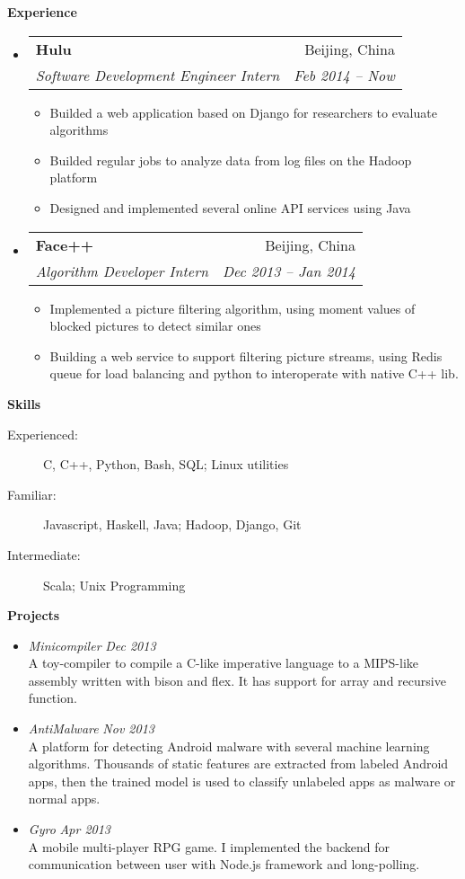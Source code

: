 \documentclass[letterpaper,11pt]{article}
\makeatletter
\newcommand{\resitem}[1]{\item #1 \vspace{-2pt}}
\newcommand{\resheading}[1]{{\large \colorbox{mygrey}{\begin{minipage}{\textwidth}{\textbf{#1 \vphantom{p\^{E}}}}\end{minipage}}}}
\newcommand{\ressubheading}[4]{
\begin{tabular*}{6.5in}{l@{\extracolsep{\fill}}r}
        \textbf{#1} & #2 \\
        \textit{#3} & \textit{#4} \\
\end{tabular*}\vspace{-6pt}}
\makeatother
\begin{document}
\resheading{Experience}
    \begin{itemize}
        \item 
            \ressubheading{Hulu}{Beijing, China}
                {Software Development Engineer Intern}{Feb 2014 -- Now}
                { \footnotesize
                \begin{itemize}
						\resitem{Builded a web application based on Django for researchers to evaluate algorithms}
                        \resitem{Builded regular jobs to analyze data from log files on the Hadoop platform}
                        \resitem{Designed and implemented several online API services using Java}
                \end{itemize}
                }
        \item 
            \ressubheading{Face++}{Beijing, China}{Algorithm Developer Intern}{Dec 2013 -- Jan 2014}
                { \footnotesize
                \begin{itemize}
                        \resitem{Implemented a picture filtering algorithm, using moment values of blocked pictures to detect similar ones}
                        \resitem{Building a web service to support filtering picture streams, using Redis queue for load balancing and python to interoperate with native C++ lib.}
                \end{itemize}
                }
    \end{itemize}  %

\resheading{Skills}
    \begin{description}
    \item[Experienced:] { \footnotesize C, C++, Python, Bash, SQL; Linux utilities}
    \item[Familiar:] { \footnotesize Javascript, Haskell, Java; Hadoop, Django, Git}
    \item[Intermediate:] { \footnotesize Scala; Unix Programming}
    \end{description} %
\resheading{Projects}
    \begin{itemize}
    \item 
    {\sl Minicompiler} \hfill \textit{Dec 2013}\\
    {\footnotesize
        {A toy-compiler to compile a C-like imperative language to a MIPS-like assembly written with bison and flex. It has support for array and recursive function.}
    }
    \item
    {\sl AntiMalware} \hfill \textit{Nov 2013}\\
    { \footnotesize 
        {A platform for detecting Android malware with several machine learning algorithms. Thousands of static features are extracted from labeled Android apps, then the trained model is used to classify unlabeled apps as malware or normal apps.}
    }
\item
    {\sl Gyro} \hfill \textit{Apr 2013}\\ 
    { \footnotesize A mobile multi-player RPG game. I implemented the backend for communication between user with Node.js framework and long-polling.}
\end{itemize}
\end{document}
